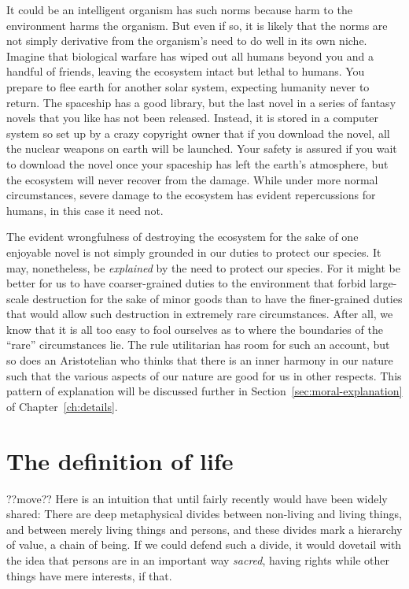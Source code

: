 It could be an intelligent organism has such norms because harm to the environment harms the organism.
But even if so, it is likely that the norms are not simply derivative from the organism's need to do well in its own 
niche. Imagine that biological warfare has wiped out all humans beyond you and a handful of friends, leaving the ecosystem 
intact but lethal to humans. You prepare to flee earth for another solar system, expecting humanity never to return. 
The spaceship has a good library, but the last novel in a series of fantasy novels that you like has not been released.
Instead, it is stored in a computer system so set up by a crazy copyright owner that if you download the novel, all the 
nuclear weapons on earth will be launched. Your safety is assured if you wait to download the novel once your spaceship has 
left the earth's atmosphere, but the ecosystem will never recover from the damage. While under more normal circumstances,
severe damage to the ecosystem has evident repercussions for humans, in this case it need not. 

The evident wrongfulness of destroying the ecosystem for the sake of one enjoyable novel is not simply grounded in our duties to 
protect our species. It may, nonetheless, be \textit{explained} by the need to protect our species. For it might be better for 
us to have coarser-grained duties to the environment that forbid large-scale destruction for the sake of minor goods than to 
have the finer-grained duties that would allow such destruction in extremely rare circumstances. After all, we know that it is 
all too easy to fool ourselves as to where the boundaries of the ``rare'' circumstances lie. The rule utilitarian has room for 
such an account, but so does an Aristotelian who thinks that there is an inner harmony in our nature such that the various 
aspects of our nature are good for us in other respects. This pattern of explanation will be discussed further in Section~\ref{sec:moral-explanation}
of Chapter~\ref{ch:details}.

\section{The definition of life}??move??
Here is an intuition that until fairly recently would have been widely shared: There are deep metaphysical divides between non-living and living things,
and between merely living things and persons, and these divides mark a hierarchy of value, a chain of being. If we could defend such a divide, it would
dovetail with the idea that persons are in an important way \textit{sacred}, having rights while other things have mere interests, if that.

